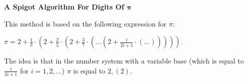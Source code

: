 \documentclass[12pt]{article}
\begin{document}
\begin{titlepage}
\begin{center}
	\LARGE\textbf{A Spigot Algorithm For Digits Of ${\boldsymbol\pi}$}
\end{center}
\large
This method is based on the following expression for $\pi$:
\begin{flushleft}

$\pi=2+\frac{1}{3}\cdot\left(2+\frac{2}{5}\cdot\left(2+\frac{3}{7}\cdot\left(\ldots\left(2+\frac{i}{2i+1}\cdot\left(\ldots\right)\right)\right)\right)\right)$.

The idea is that in the number system with a variable base (which is equal to $\frac{i}{2i+1}$ for $i = 1,2,\ldots$) $\pi$ is equal to $2,\!\left(2\right)$.

\end{flushleft}
\end{titlepage}
\end{document}
